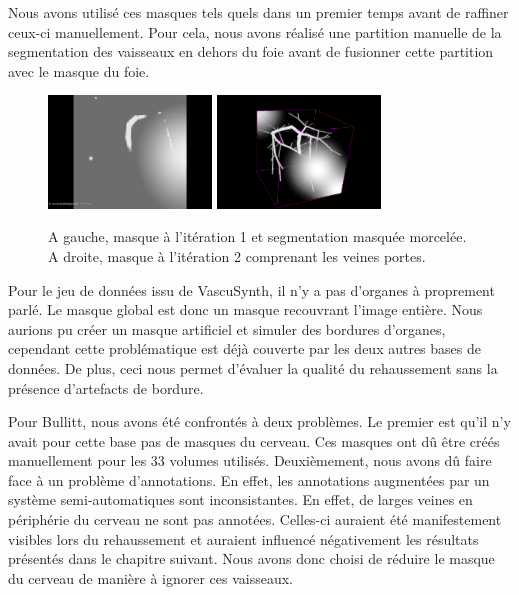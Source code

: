 Nous avons utilisé ces masques tels quels dans un premier temps avant de raffiner ceux-ci manuellement. Pour cela, nous avons réalisé une partition manuelle de la segmentation des vaisseaux en dehors du foie avant de fusionner cette partition avec le masque du foie.

\begin{figure}
  \centering
  \includegraphics[height=3cm]{Images/2D_VBI.png}
  \includegraphics[height=3cm]{Images/3D_VBI.png}
  \label{fig:masques_globaux_ircad}
  \caption{A gauche, masque à l'itération 1 et segmentation masquée morcelée. A droite, masque à l'itération 2 comprenant les veines portes.}
\end{figure}

Pour le jeu de données issu de VascuSynth, il n'y a pas d'organes à proprement parlé. Le masque global est donc un masque recouvrant l'image entière. Nous aurions pu créer un masque artificiel et simuler des bordures d'organes, cependant cette problématique est déjà couverte par les deux autres bases de données. De plus, ceci nous permet d'évaluer la qualité du rehaussement sans la présence d'artefacts de bordure.

Pour Bullitt, nous avons été confrontés à deux problèmes. Le premier est qu'il n'y avait pour cette base pas de masques du cerveau. Ces masques ont dû être créés manuellement pour les 33 volumes utilisés. Deuxièmement, nous avons dû faire face à un problème d'annotations. En effet, les annotations augmentées par un système semi-automatiques sont inconsistantes. En effet, de larges veines en périphérie du cerveau ne sont pas annotées. Celles-ci auraient été manifestement visibles lors du rehaussement et auraient influencé négativement les résultats présentés dans le chapitre suivant. Nous avons donc choisi de réduire le masque du cerveau de manière à ignorer ces vaisseaux.

